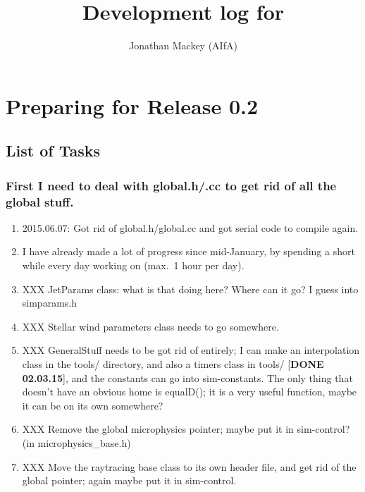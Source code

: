 \documentclass[a4paper,11pt]{article}
\title{Development log for \pion{}}
\author{Jonathan Mackey (AIfA)}
\begin{document}
\maketitle


\section{Preparing for Release 0.2}

\subsection{List of Tasks}

\subsubsection{First I need to deal with global.h/.cc to get rid of all the global stuff.}
\begin{enumerate}
\item 2015.06.07: Got rid of global.h/global.cc and got serial code to compile again.
\item I have already made a lot of progress since mid-January, by spending a short while every day working on \pion{} (max.~1 hour per day).
\item XXX JetParams class: what is that doing here?  Where can it go?  I guess into simparams.h
\item XXX Stellar wind parameters class needs to go somewhere.
\item XXX GeneralStuff needs to be got rid of entirely; I can make an interpolation class in the tools/ directory, and also a timers class in tools/ [\textbf{DONE 02.03.15}], and the constants can go into sim-constants.
  The only thing that doesn't have an obvious home is equalD(); it is a very useful function, maybe it can be on its own somewhere?
\item XXX Remove the global microphysics pointer; maybe put it in sim-control? (in microphysics\_base.h)
\item XXX Move the raytracing base class to its own header file, and get rid of the global pointer; again maybe put it in sim-control.
\end{enumerate}
\end{document}
